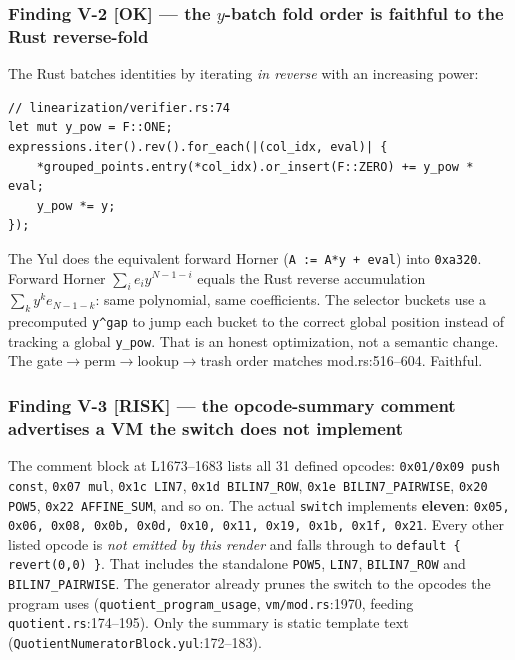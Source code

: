 \subsubsection*{Finding V-2 \textcolor{tracegreen}{[OK]} --- the $y$-batch fold order is faithful to the Rust reverse-fold}

The Rust batches identities by iterating \emph{in reverse} with an
increasing power:

\begin{lstlisting}[style=rust]
// linearization/verifier.rs:74
let mut y_pow = F::ONE;
expressions.iter().rev().for_each(|(col_idx, eval)| {
    *grouped_points.entry(*col_idx).or_insert(F::ZERO) += y_pow * eval;
    y_pow *= y;
});
\end{lstlisting}

The Yul does the equivalent forward Horner
(\texttt{A := A*y + eval}) into \texttt{0xa320}. Forward Horner
$\sum_i e_i y^{N-1-i}$ equals the Rust reverse accumulation
$\sum_k y^k e_{N-1-k}$: same polynomial, same coefficients. The
selector buckets use a precomputed \texttt{y\textasciicircum gap} to
jump each bucket to the correct global position instead of tracking
a global \texttt{y\_pow}. That is an honest optimization, not a
semantic change. The gate$\to$perm$\to$lookup$\to$trash order matches
mod.rs:516--604. Faithful.

\subsubsection*{Finding V-3 \textcolor{rustorange}{[RISK]} --- the opcode-summary comment advertises a VM the switch does not implement}

The comment block at L1673--1683 lists all 31 defined opcodes:
\texttt{0x01/\allowbreak{}0x09 push const}, \texttt{0x07 mul}, \texttt{0x1c LIN7},
\texttt{0x1d BILIN7\_ROW}, \texttt{0x1e BILIN7\_\allowbreak{}PAIRWISE},
\texttt{0x20 POW5}, \texttt{0x22 AFFINE\_SUM}, and so on. The actual
\texttt{switch} implements \textbf{eleven}:
\texttt{0x05, 0x06, 0x08, 0x0b, 0x0d, 0x10, 0x11, 0x19, 0x1b, 0x1f,
0x21}. Every other listed opcode is \emph{not emitted by this render}
and falls through to \texttt{default \{ revert(0,0) \}}. That
includes the standalone \texttt{POW5}, \texttt{LIN7},
\texttt{BILIN7\_ROW} and \texttt{BILIN7\_PAIRWISE}. The generator
already prunes the switch to the opcodes the program uses
(\texttt{quotient\_\allowbreak{}program\_\allowbreak{}usage}, \texttt{vm/mod.rs}:1970, feeding
\texttt{quotient.rs}:174--195). Only the summary is static template
text (\texttt{QuotientNumeratorBlock.yul}:172--183).

